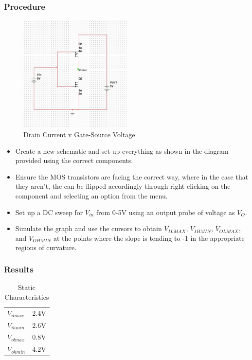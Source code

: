 \documentclass[12pt]{article}
\begin{document}
\subsubsection{Procedure}
\begin{figure}[h]
\centering
\includegraphics[width=0.5\textwidth]{5.jpg}
\caption{Drain Current v Gate-Source Voltage}
\end{figure}
\begin{itemize}
\item Create a new schematic and set up everything as shown in the diagram provided using the correct components.
\item Ensure the MOS transistors are facing the correct way, where in the case that they aren't, the can be flipped accordingly through right clicking on the component and selecting an option from the menu.
\item Set up a DC sweep for $V_{in}$ from 0-5V using an output probe of voltage as $V_O$.
\item Simulate the graph and use the cursors to obtain $V_{IL MAX}$, $V_{IH MIN}$, $V_{OL MAX}$, and $V_{OH MIN}$ at the points where the slope is tending to -1 in the appropriate regions of curvature.
\end{itemize}

\subsubsection{Results}

\begin{table}[h]
\centering
\begin{tabular}{ll}
$V_{il max}$ & 2.4V \\
$V_{ih min}$ & 2.6V \\
$V_{ol max}$ & 0.8V \\
$V_{oh min}$ & 4.2V
\end{tabular}
\caption{Static Characteristics}
\end{table}
\end{document}
